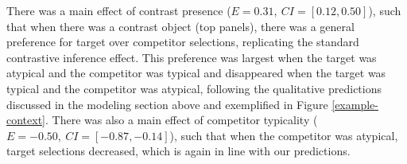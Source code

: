 \documentclass[10pt,letterpaper]{article}
\newcommand{\jd}[1]{\textcolor{Purple}{[jd: #1]}}
\newcommand{\figref}[1]{Figure \ref{#1}}
\begin{document}
There was a main effect of contrast presence ($E=0.31,\ CI=[0.12,0.50]$), such that when there was a contrast object (top panels), there was a general preference for target over competitor selections, replicating the standard contrastive inference effect. This preference was largest when the target was atypical and the competitor was typical and disappeared  when the target was typical and the competitor was atypical, following the qualitative predictions discussed in the modeling section above and exemplified  in \figref{example-context}. There was also a main effect of competitor typicality ($E=-0.50,\ CI=[-0.87,-0.14]$), such that when the competitor was atypical, target selections decreased, which is again in line with our predictions.




\end{document}
